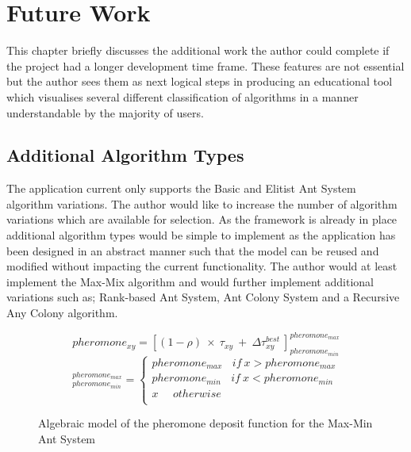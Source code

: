 \chapter{Future Work}

This chapter briefly discusses the additional work the author could complete if the project had a longer development time frame. These features are not essential but the author sees them as next logical steps in producing an educational tool which visualises several different classification of algorithms in a manner understandable by the majority of users.

\section{Additional Algorithm Types}

The application current only supports the Basic and Elitist Ant System algorithm variations. The author would like to increase the number of algorithm variations which are available for selection. As the framework is already in place additional algorithm types would be simple to implement as the application has been designed in an abstract manner such that the model can be reused and modified without impacting the current functionality. The author would at least implement the Max-Mix algorithm and would further implement additional variations such as; Rank-based Ant System, Ant Colony System and a Recursive Any Colony algorithm. 

\begin{figure}[H]
\Large
\begin{equation}
pheromone_{xy} = [(1 - \rho)\ \times\ \tau_{xy}\ +\ \Delta\tau_{xy}^{best}\ ]_{pheromone_{min}}^{pheromone_{max}}
\end{equation}
\begin{equation}
[x]_{pheromone_{min}}^{pheromone_{max}} = \left\{\begin{matrix}
pheromone_{max}\ \ \ \ if\ x > pheromone_{max} \\ 
pheromone_{min}\ \ \ \ if\ x < pheromone_{min} \\ 
x \ \ \ \ \ \ otherwise\\ 
\end{matrix}\right.
\end{equation}

\caption{Algebraic model of the pheromone deposit function for the Max-Min Ant System \cite{AntColontSite:slides}}
\label{MaxMinSystemPhero}

\end{figure}

